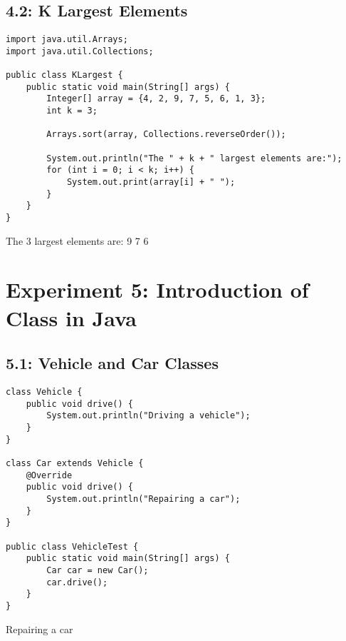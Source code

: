 \documentclass[a4paper,12pt]{article}
\begin{document}
\clearpage
\subsection{4.2: K Largest Elements}
\begin{samepage}
\begin{lstlisting}[caption={KLargest.java}]
import java.util.Arrays;
import java.util.Collections;

public class KLargest {
    public static void main(String[] args) {
        Integer[] array = {4, 2, 9, 7, 5, 6, 1, 3};
        int k = 3;
        
        Arrays.sort(array, Collections.reverseOrder());
        
        System.out.println("The " + k + " largest elements are:");
        for (int i = 0; i < k; i++) {
            System.out.print(array[i] + " ");
        }
    }
}
\end{lstlisting}

\begin{outputlisting}
The 3 largest elements are:
9 7 6 
\end{outputlisting}
\end{samepage}

\section{Experiment 5: Introduction of Class in Java}

\clearpage
\subsection{5.1: Vehicle and Car Classes}
\begin{samepage}
\begin{lstlisting}[caption={VehicleTest.java}]
class Vehicle {
    public void drive() {
        System.out.println("Driving a vehicle");
    }
}

class Car extends Vehicle {
    @Override
    public void drive() {
        System.out.println("Repairing a car");
    }
}

public class VehicleTest {
    public static void main(String[] args) {
        Car car = new Car();
        car.drive();
    }
}
\end{lstlisting}

\begin{outputlisting}
Repairing a car
\end{outputlisting}
\end{samepage}
\end{document}
